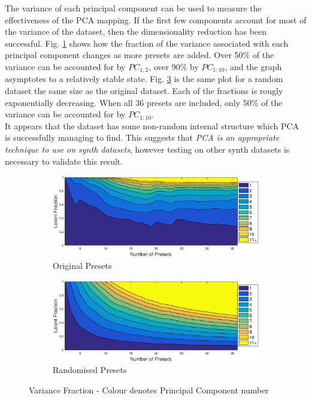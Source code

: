 \documentclass[11pt, oneside]{report}   	%
\begin{document}
The variance of each principal component can be used to measure the effectiveness of the PCA mapping. If the first few components account for most of the variance of the dataset, then the dimensionality reduction has been successful.
Fig. \ref{fig:LatentOriginal} shows how the fraction of the variance associated with each principal component changes as more presets are added. Over 50\% of the variance can be accounted for by $PC_{1,2}$,  over 90\% by $PC_{1 : 10}$, and the graph asymptotes to a relatively stable state. Fig. \ref{fig:LatentRandom} is the same plot for a random dataset the same size as the original dataset. Each of the fractions is rougly exponentially decreasing. When all 36 presets are included, only 50\% of the variance can be accounted for by $PC_{1 : 10}$. \\
It appears that the dataset has some non-random internal structure which PCA is successfully managing to find. This suggests that \emph{PCA is an appropriate technique to use on synth datasets}, however testing on other synth datasets is necessary to validate this result.
\begin{figure}[h]
	\vspace{-5pt}
	\hspace{-40pt}
	\begin{subfigure}{3.5in}
		\includegraphics[trim = {0, 0.1cm, 0, 0.5cm}, clip, width = \textwidth]{LatentFraction.eps}
		\caption{Original Presets}
		\label{fig:LatentOriginal}
	\end{subfigure} 
%
	\begin{subfigure}{3.5in}
		\includegraphics[trim = {0, 0.1cm, 0, 0.5cm}, clip, width = \textwidth]{LatentFractionRandom.eps}
		\caption{Randomised Presets}
		\label{fig:LatentRandom}
	\end{subfigure}
	\caption{Variance Fraction - Colour denotes Principal Component number}
\end{figure}
\end{document}
